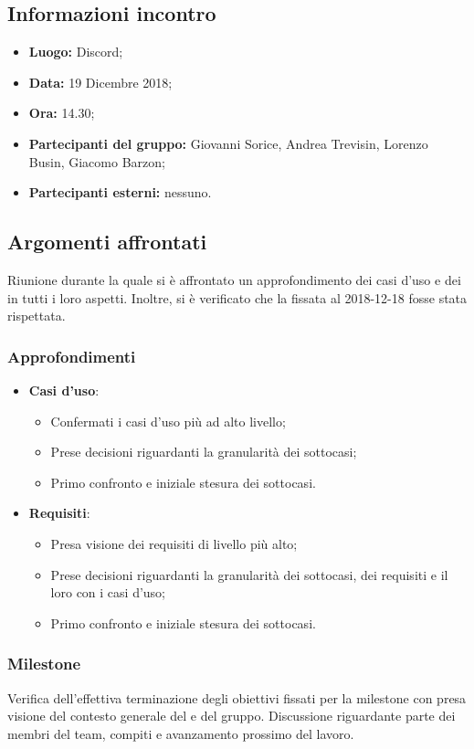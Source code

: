 \subsection{Informazioni incontro}
\begin{itemize}
	\item { \textbf{Luogo:} Discord;  }
	\item { \textbf{Data:} 19 Dicembre 2018; }
	\item { \textbf{Ora:} 14.30; }
	\item { \textbf{Partecipanti del gruppo:} Giovanni Sorice, Andrea Trevisin, Lorenzo Busin, Giacomo Barzon; }
	\item { \textbf{Partecipanti esterni:} nessuno. }
\end{itemize}


\subsection{Argomenti affrontati}
Riunione durante la quale si è affrontato un approfondimento dei casi d'uso e dei  in tutti i loro aspetti. Inoltre, si è verificato che la  fissata al 2018-12-18 fosse stata rispettata.

\subsubsection{Approfondimenti}
\begin{itemize}
	\item {\textbf{Casi d'uso}}:
	\begin{itemize}
			\item Confermati i casi d'uso più ad alto livello;		
			\item Prese decisioni riguardanti la granularità dei sottocasi;
			\item Primo confronto e iniziale stesura dei sottocasi.
	\end{itemize}
	\item {\textbf{Requisiti}}:
	\begin{itemize}
		\item Presa visione dei requisiti di livello più alto;		
		\item Prese decisioni riguardanti la granularità dei sottocasi, dei requisiti e il loro  con i casi d'uso;
		\item Primo confronto e iniziale stesura dei sottocasi.
	\end{itemize}
\end{itemize}

\subsubsection{Milestone}
Verifica dell'effettiva terminazione degli obiettivi fissati per la milestone con presa visione del contesto generale del  e del gruppo. Discussione riguardante parte dei membri del team, compiti e avanzamento prossimo del lavoro.
